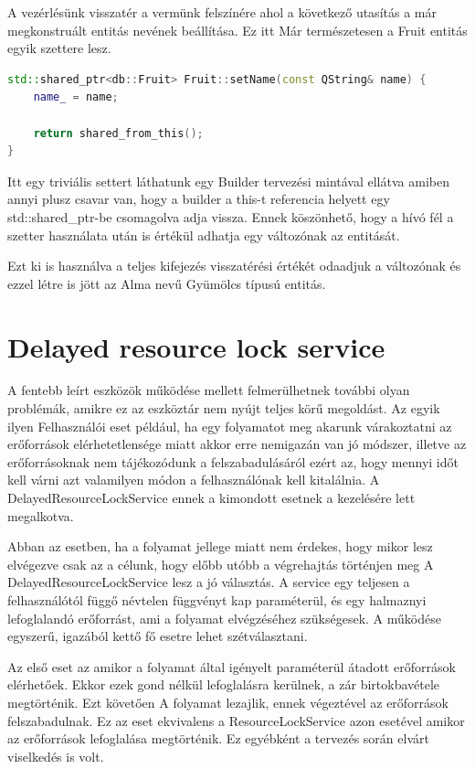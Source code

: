 A vezérlésünk visszatér a vermünk felszínére ahol a következő utasítás a már megkonstruált entitás nevének beállítása. Ez itt Már természetesen a Fruit entitás egyik szettere lesz.

\begin{lstlisting}[language={C++}]
std::shared_ptr<db::Fruit> Fruit::setName(const QString& name) {
    name_ = name;
    
    return shared_from_this();
}
\end{lstlisting}

Itt egy triviális settert láthatunk egy Builder tervezési mintával ellátva amiben annyi plusz csavar van, hogy a builder a this-t referencia helyett egy std::shared\_ptr-be csomagolva adja vissza. Ennek köszönhető, hogy a hívó fél a szetter használata után is értékül adhatja egy változónak az entitását.

Ezt ki is használva a teljes kifejezés visszatérési értékét odaadjuk a változónak és ezzel létre is jött az Alma nevű Gyümölcs típusú entitás.

\section{Delayed resource lock service}

A fentebb leírt eszközök működése mellett felmerülhetnek további olyan problémák, amikre ez az eszköztár nem nyújt teljes körű megoldást. Az egyik ilyen Felhasználói eset például, ha egy folyamatot meg akarunk várakoztatni az erőforrások elérhetetlensége miatt akkor erre nemigazán van jó módszer, illetve az erőforrásoknak nem tájékozódunk a felszabadulásáról ezért az, hogy mennyi időt kell várni azt valamilyen módon a felhasználónak kell kitalálnia. A DelayedResourceLockService ennek a kimondott esetnek a kezelésére lett megalkotva. 

Abban az esetben, ha a folyamat jellege miatt nem érdekes, hogy mikor lesz elvégezve csak az a célunk, hogy előbb utóbb a végrehajtás történjen meg A DelayedResourceLockService lesz a jó választás. A service egy teljesen a felhasználótól függő névtelen függvényt kap paraméterül, és egy halmaznyi lefoglalandó erőforrást, ami a folyamat elvégzéséhez szükségesek. A működése egyszerű, igazából kettő fő esetre lehet szétválasztani.

Az első eset az amikor a folyamat által igényelt paraméterül átadott erőforrások elérhetőek. Ekkor ezek gond nélkül lefoglalásra kerülnek, a zár birtokbavétele megtörténik. Ezt követően A folyamat lezajlik, ennek végeztével az erőforrások felszabadulnak. Ez az eset ekvivalens a ResourceLockService azon esetével amikor az erőforrások lefoglalása megtörténik. Ez egyébként a tervezés során elvárt viselkedés is volt.

